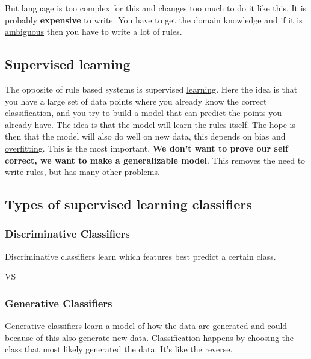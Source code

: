 \documentclass[
  11pt,
  british,
]{article}
\begin{document}
But language is too complex for this and changes too much to do it like
this. It is probably \textbf{expensive} to write. You have to get the
domain knowledge and if it is
\href{../Languages/Ambiguity.md}{ambiguous} then you have to write a lot
of rules.

\hypertarget{supervised-learning}{%
\subsection{Supervised learning}\label{supervised-learning}}

The opposite of rule based systems is supervised
\href{../Other/Learning.md}{learning}. Here the idea is that you have a
large set of data points where you already know the correct
classification, and you try to build a model that can predict the points
you already have. The idea is that the model will learn the rules
itself. The hope is then that the model will also do well on new data,
this depends on bias and
\href{../Prediction/Overfitting.md}{overfitting}. This is the most
important. \textbf{We don't want to prove our self correct, we want to
make a generalizable model}. This removes the need to write rules, but
has many other problems.

\hypertarget{types-of-supervised-learning-classifiers}{%
\subsection{Types of supervised learning
classifiers}\label{types-of-supervised-learning-classifiers}}

\hypertarget{discriminative-classifiers}{%
\subsubsection{Discriminative
Classifiers}\label{discriminative-classifiers}}

Discriminative classifiers learn which features best predict a certain
class.

VS

\hypertarget{generative-classifiers}{%
\subsubsection{Generative Classifiers}\label{generative-classifiers}}

Generative classifiers learn a model of how the data are generated and
could because of this also generate new data. Classification happens by
choosing the class that most likely generated the data. It's like the
reverse.
\end{document}
